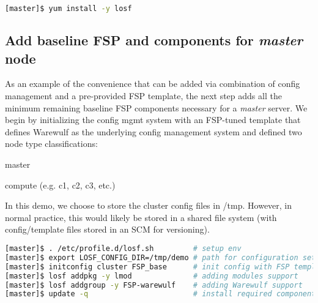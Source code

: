 \documentclass[letterpaper]{article}
\begin{document}
\vspace*{0.2cm}

\begin{lstlisting}[language=bash,caption={Commands run on {\bf master node}.}]
[master]$ yum install -y losf
\end{lstlisting}


\subsection{Add baseline FSP and components for {\em master} node}

As an example of the convenience that can be added via combination of config
management and a pre-provided FSP template, the next step adds all the minimum
remaining baseline FSP components necessary for a {\em master} server. We begin
by initializing the config mgmt system with an FSP-tuned template that defines
Warewulf as the underlying config management system and defined two node type
classifications:
\begin{itemize*}
\item master
\item compute (e.g. c1, c2, c3, etc.)
\end{itemize*}
In this demo, we choose to store the cluster config files in /tmp. However, in
normal practice, this would likely be stored in a shared file system (with
config/template files stored in an SCM for versioning).

\vspace*{0.2cm}


\begin{lstlisting}[language=bash,keywords={}]
[master]$ . /etc/profile.d/losf.sh         # setup env
[master]$ export LOSF_CONFIG_DIR=/tmp/demo # path for configuration setup
[master]$ initconfig cluster FSP_base      # init config with FSP template
[master]$ losf addpkg -y lmod              # adding modules support
[master]$ losf addgroup -y FSP-warewulf    # adding Warewulf support
[master]$ update -q                        # install required components
\end{lstlisting}


\end{document}
